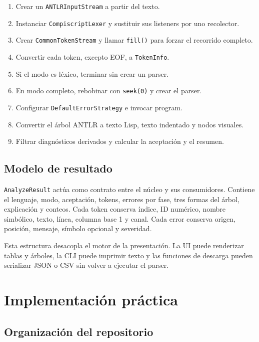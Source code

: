 \documentclass[12pt,letterpaper,oneside]{report}
\newcommand{\archivo}[1]{\texttt{#1}}
\newcommand{\regla}[1]{\textsf{#1}}
\begin{document}
\begin{enumerate}
  \item Crear un \archivo{ANTLRInputStream} a partir del texto.
  \item Instanciar \archivo{CompiscriptLexer} y sustituir sus listeners por uno
        recolector.
  \item Crear \archivo{CommonTokenStream} y llamar \archivo{fill()} para forzar el
        recorrido completo.
  \item Convertir cada token, excepto EOF, a \archivo{TokenInfo}.
  \item Si el modo es léxico, terminar sin crear un parser.
  \item En modo completo, rebobinar con \archivo{seek(0)} y crear el parser.
  \item Configurar \archivo{DefaultErrorStrategy} e invocar \regla{program}.
  \item Convertir el árbol ANTLR a texto Lisp, texto indentado y nodos visuales.
  \item Filtrar diagnósticos derivados y calcular la aceptación y el resumen.
\end{enumerate}

\section{Modelo de resultado}

\archivo{AnalyzeResult} actúa como contrato entre el núcleo y sus consumidores.
Contiene el lenguaje, modo, aceptación, tokens, errores por fase, tres formas del
árbol, explicación y conteos. Cada token conserva índice, ID numérico, nombre
simbólico, texto, línea, columna base 1 y canal. Cada error conserva origen, posición,
mensaje, símbolo opcional y severidad.

Esta estructura desacopla el motor de la presentación. La UI puede renderizar tablas
y árboles, la CLI puede imprimir texto y las funciones de descarga pueden serializar
JSON o CSV sin volver a ejecutar el parser.

\chapter{Implementación práctica}

\section{Organización del repositorio}
\end{document}
